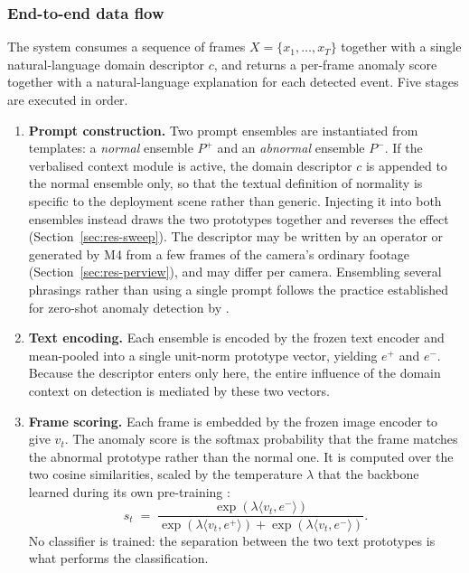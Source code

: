 \documentclass[a4paper,fleqn]{cas-sc}
\begin{document}
\subsubsection{End-to-end data flow}
The system consumes a sequence of frames $X = \{x_1,\dots,x_T\}$ together with a
single natural-language domain descriptor $c$, and returns a per-frame anomaly
score together with a natural-language explanation for each detected event. Five
stages are executed in order.

\begin{enumerate}[{Stage}~1.]
  \item \textbf{Prompt construction.} Two prompt ensembles are instantiated from
        templates: a \emph{normal} ensemble $P^{+}$ and an \emph{abnormal}
        ensemble $P^{-}$. If the verbalised context module is active, the domain
        descriptor $c$ is appended to the normal ensemble only, so that the
        textual definition of normality is specific to the deployment scene
        rather than generic. Injecting it into both ensembles instead draws the
        two prototypes together and reverses the effect
        (Section~\ref{sec:res-sweep}). The descriptor may be written by an
        operator or generated by M4 from a few frames of the camera's ordinary
        footage (Section~\ref{sec:res-perview}), and may differ per camera.
        Ensembling several phrasings rather than using a single prompt
        follows the practice established for zero-shot anomaly detection by
        \citet{jeong2023winclip}.

  \item \textbf{Text encoding.} Each ensemble is encoded by the frozen text
        encoder and mean-pooled into a single unit-norm prototype vector,
        yielding $e^{+}$ and $e^{-}$. Because the descriptor enters only here,
        the entire influence of the domain context on detection is mediated by
        these two vectors.

  \item \textbf{Frame scoring.} Each frame is embedded by the frozen image
        encoder to give $v_t$. The anomaly score is the softmax probability that
        the frame matches the abnormal prototype rather than the normal one. It
        is computed over the two cosine similarities, scaled by the temperature
        $\lambda$ that the backbone learned during its own pre-training
        \citep{radford2021clip}:
        \begin{equation}
        s_t \;=\; \frac{\exp\!\left(\lambda \langle v_t, e^{-}\rangle\right)}
                       {\exp\!\left(\lambda \langle v_t, e^{+}\rangle\right)
                       +\exp\!\left(\lambda \langle v_t, e^{-}\rangle\right)}.
        \label{eq:framescore}
        \end{equation}
        No classifier is trained: the separation between the two text
        prototypes is what performs the classification.


\end{enumerate}
\end{document}
